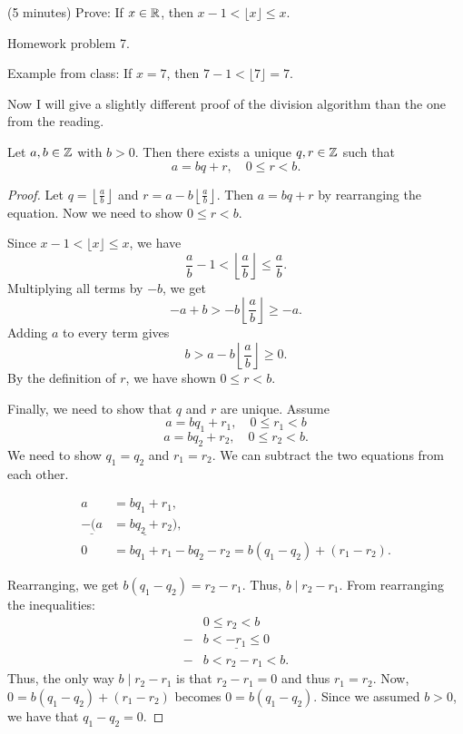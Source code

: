 \documentclass[letterpaper, 11 pt]{article}
\begin{document}
\begin{br}(5 minutes)
 Prove: If $x\in\mathbb R$, then $x-1<\lfloor x\rfloor \leq x$.
\end{br}
\begin{solution}
 Homework problem 7.
\end{solution}
 Example from class: If $x=7$, then $7-1<\lfloor 7\rfloor=7$.
 
Now I will give a slightly different proof of the division algorithm than the one from the reading.

\begin{thm}
 Let $a,b\in\mathbb Z$ with $b>0$. Then there exists a unique $q,r\in\mathbb Z$ such that \[a=bq+r, \quad 0\leq r <b.\]
\end{thm}
\begin{proof}
Let $q=\left\lfloor\frac{a}{b}\right\rfloor$ and $r=a-b\left\lfloor\frac{a}{b}\right\rfloor$. Then $a=bq+r$ by rearranging the equation. 
Now we need to show $0\leq r<b$. 

Since $x-1<\lfloor x\rfloor\leq x$, we have \[\frac{a}{b}-1<\left\lfloor\frac{a}{b}\right\rfloor\leq\frac{a}{b}.\] 
Multiplying all terms by $-b$, we get 
 \[-a+b>-b\left\lfloor\frac{a}{b}\right\rfloor\geq-a.\]
 Adding $a$ to every term gives \[b>a-b\left\lfloor\frac{a}{b}\right\rfloor\geq 0.\] 
By the definition of $r$, we have shown $0\leq r <b$.

Finally, we need to show that $q$ and $r$ are unique.
Assume \[a=bq_1+r_1, \quad 0\leq r_1<b\]
 \[a=bq_2+r_2, \quad 0\leq r_2<b.\]
 We need to show $q_1=q_2$ and $r_1=r_2$. We can subtract the two equations from each other. 
 
\begin{align*}
  a&=bq_1+r_1, \\
 \underline{ -(a}&\underline{=bq_2+r_2)}, \\
 0&=bq_1+r_1-bq_2-r_2=b(q_1-q_2)+(r_1-r_2) . 
\end{align*}

Rearranging, we get $b(q_1-q_2)=r_2-r_1$. Thus, $b\mid r_2-r_1$. From rearranging the inequalities:
\begin{align*}
 & 0\leq r_2<b\\
- & \underline{b< -r_1\leq 0}\\
 -&b<r_2-r_1<b.
\end{align*}
Thus, the only way $b\mid r_2-r_1$ is that $r_2-r_1=0$ and thus $r_1=r_2$. Now, $0=b(q_1-q_2)+(r_1-r_2)$ becomes $0=b(q_1-q_2)$. Since we assumed $b>0$, we have that $q_1-q_2=0$. 
\end{proof}
\end{document}
